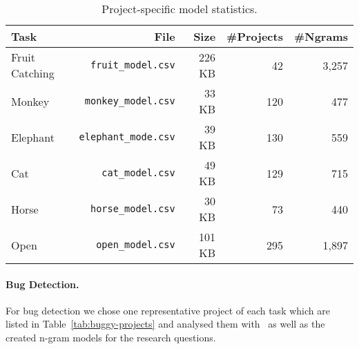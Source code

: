\begin{table}[hbtp]
    \centering
    \caption[Project-specific model statistics]{\label{tab:specific-model}Project-specific model statistics.}
    \begin{tabular}{lrrrr}
        \toprule
        Task & File & Size & \#Projects & \#Ngrams \\
        \midrule
        Fruit Catching & \texttt{fruit\_model.csv} & 226 KB & 42 & 3,257  \\
        Monkey & \texttt{monkey\_model.csv} & 33 KB & 120 & 477 \\
        Elephant & \texttt{elephant\_mode.csv} & 39 KB & 130 & 559 \\
        Cat & \texttt{cat\_model.csv} & 49 KB & 129 & 715 \\
        Horse & \texttt{horse\_model.csv} & 30 KB & 73 & 440 \\
        Open & \texttt{open\_model.csv} & 101 KB & 295 & 1,897 \\
        \bottomrule
    \end{tabular}
\end{table}

\paragraph{Bug Detection.}
For bug detection we chose one representative project of each task which are listed in Table~\ref{tab:buggy-projects} and analysed them with \litterbox\ as well as the created n-gram models for the research questions. 

